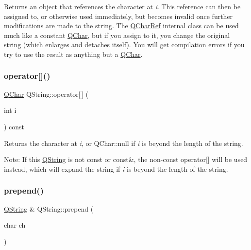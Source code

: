 Returns an object that references the character at {\itshape i}. This reference can then be assigned to, or otherwise used immediately, but becomes invalid once further modifications are made to the string. The \mbox{\hyperlink{class_q_char_ref}{Q\+Char\+Ref}} internal class can be used much like a constant \mbox{\hyperlink{class_q_char}{Q\+Char}}, but if you assign to it, you change the original string (which enlarges and detaches itself). You will get compilation errors if you try to use the result as anything but a \mbox{\hyperlink{class_q_char}{Q\+Char}}. \mbox{\label{class_q_string_a2568867dc7f994e05c0e582fc510bbc2}} 
\subsubsection{\texorpdfstring{operator[]()}{operator[]()}\hspace{0.1cm}{\footnotesize\ttfamily [2/2]}}
{\footnotesize\ttfamily \mbox{\hyperlink{class_q_char}{Q\+Char}} Q\+String\+::operator\mbox{[}$\,$\mbox{]} (\begin{DoxyParamCaption}\item[{int}]{i }\end{DoxyParamCaption}) const\hspace{0.3cm}{\ttfamily [inline]}}

Returns the character at {\itshape i}, or Q\+Char\+::null if {\itshape i} is beyond the length of the string.

Note\+: If this \mbox{\hyperlink{class_q_string}{Q\+String}} is not const or const\&, the non-\/const operator\mbox{[}\mbox{]} will be used instead, which will expand the string if {\itshape i} is beyond the length of the string. \mbox{\label{class_q_string_a960e7c9c3ead447bd3da1332ca06a796}} 
\subsubsection{\texorpdfstring{prepend()}{prepend()}\hspace{0.1cm}{\footnotesize\ttfamily [1/3]}}
{\footnotesize\ttfamily \mbox{\hyperlink{class_q_string}{Q\+String}} \& Q\+String\+::prepend (\begin{DoxyParamCaption}\item[{char}]{ch }\end{DoxyParamCaption})\hspace{0.3cm}{\ttfamily [inline]}}

